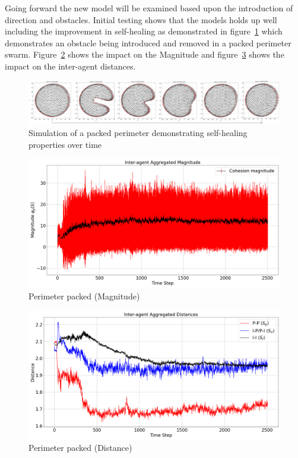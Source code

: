 \documentclass[12pt,a4paper]{IEEEtran}
\begin{document}
Going forward the new model will be examined based upon the introduction of direction and obstacles. Initial testing shows that the models holds up well including the improvement in self-healing as demonstrated in figure~\ref{fig:packedSelfHealing} which demonstrates an obstacle being introduced and removed in a packed perimeter swarm. Figure~\ref{fig:future7} shows the impact on the Magnitude and figure~\ref{fig:future8} shows the impact on the inter-agent distances.
\begin{figure}[ht!]
  \begin{center}
    \includegraphics[width=17.6cm]{figures/FutureTime}
  \end{center}
  \caption{Simulation of a packed perimeter demonstrating self-healing properties over time\label{fig:packedSelfHealing}}
\end{figure}

\begin{figure}[H]
	\begin{center}
		\includegraphics[width=1.0\linewidth]{figures/future7}
	\end{center}
	\caption{Perimeter packed (Magnitude)\label{fig:future7}}
\end{figure}

\begin{figure}[H]
	\begin{center}
		\includegraphics[width=1.0\linewidth]{figures/future8}
	\end{center}
	\caption{Perimeter packed (Distance)\label{fig:future8}}
\end{figure}



\end{document}
